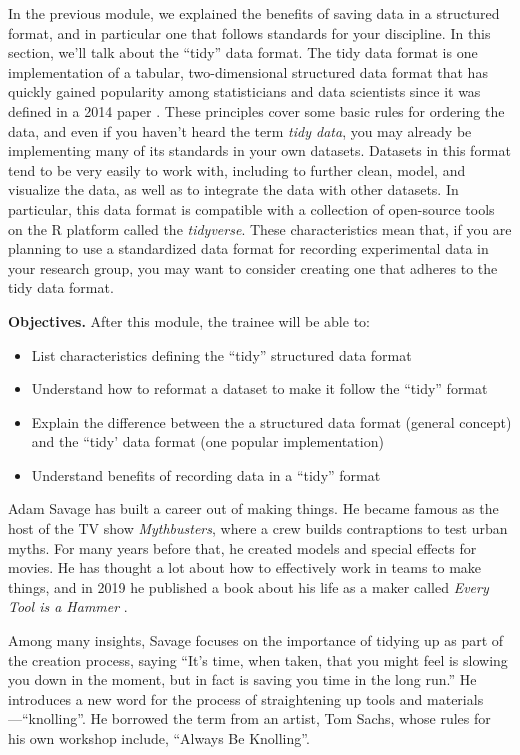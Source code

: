 \documentclass[]{tufte-book}
\providecommand{\tightlist}{%
  \setlength{\itemsep}{0pt}\setlength{\parskip}{0pt}}
\begin{document}
In the previous module, we explained the benefits of saving data in a structured
format, and in particular one that follows standards for your discipline. In
this section, we'll talk about the ``tidy'' data format. The tidy data format is
one implementation of a tabular, two-dimensional structured data format that has
quickly gained popularity among statisticians and data scientists since it was
defined in a 2014 paper \citep{wickham2014tidy}. These principles cover some basic
rules for ordering the data, and even if you haven't heard the term \emph{tidy data},
you may already be implementing many of its standards in your own datasets.
Datasets in this format tend to be very easily to work with, including to
further clean, model, and visualize the data, as well as to integrate the data
with other datasets. In particular, this data format is compatible with a
collection of open-source tools on the R platform called the
\emph{tidyverse}. These characteristics mean that, if you are planning to use a
standardized data format for recording experimental data in your research group,
you may want to consider creating one that adheres to the tidy data format.

\textbf{Objectives.} After this module, the trainee will be able to:

\begin{itemize}
\tightlist
\item
  List characteristics defining the ``tidy'' structured data format
\item
  Understand how to reformat a dataset to make it follow the ``tidy'' format
\item
  Explain the difference between the a structured data format (general concept)
  and the ``tidy' data format (one popular implementation)
\item
  Understand benefits of recording data in a ``tidy'' format
\end{itemize}

Adam Savage has built a career out of making things. He became famous as the
host of the TV show \emph{Mythbusters}, where a crew builds contraptions to test
urban myths. For many years before that, he created models and special effects
for movies. He has thought a lot about how to effectively work in teams to make
things, and in 2019 he published a book about his life as a maker called \emph{Every
Tool is a Hammer} \citep{savage2020every}.

Among many insights, Savage focuses on the importance
of tidying up as part of the creation process, saying ``It's time, when taken,
that you might feel is slowing you down in the moment, but in fact is saving you
time in the long run.'' \citep{savage2020every} He introduces a new word for the
process of straightening up tools and materials---``knolling''. He borrowed the
term from an artist, Tom Sachs, whose rules for his own workshop include,
``Always Be Knolling''.
\end{document}
